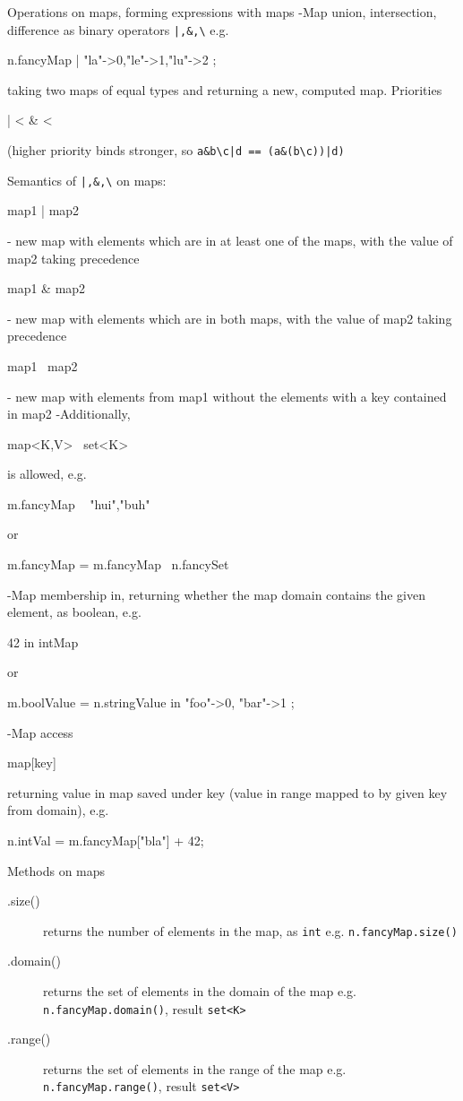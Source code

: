 Operations on maps, forming expressions with maps
-Map union, intersection, difference as binary operators
\verb#|,&,\#
e.g. 
\begin{grgenlet} 
n.fancyMap | { "la"->0,"le"->1,"lu"->2 };
\end{grgenlet}
taking two maps of equal types and returning a new, computed map.
Priorities 
\begin{grgenlet}
| < & < \
\end{grgenlet}
(higher priority binds stronger, so
\verb#a&b\c|d == (a&(b\c))|d)#

Semantics of \verb#|,&,\# on maps:
\begin{grgenlet}
map1 | map2
\end{grgenlet}
 - new map with elements which are in at least one of the maps, with the value of map2 taking precedence
\begin{grgenlet}
map1 & map2
\end{grgenlet}
- new map with elements which are in both maps, with the value of map2 taking precedence
\begin{grgenlet}
map1 \ map2
\end{grgenlet}
- new map with elements from map1 without the elements with a key contained in map2
-Additionally, 
\begin{grgenlet}
map<K,V> \ set<K>
\end{grgenlet}
is allowed, e.g.
\begin{grgenlet}
m.fancyMap \ { "hui","buh" }
\end{grgenlet} 
or 
\begin{grgenlet}
m.fancyMap = m.fancyMap \ n.fancySet 
\end{grgenlet}
-Map membership in, returning whether the map domain contains the given element, as boolean, e.g. 
\begin{grgenlet}
42 in intMap
\end{grgenlet}  
or  
\begin{grgenlet}
m.boolValue = n.stringValue in { "foo"->0, "bar"->1 };
\end{grgenlet}
-Map access 
\begin{grgenlet}
map[key]
\end{grgenlet}
returning value in map saved under key (value in range mapped to by given key from domain), e.g.
\begin{grgenlet}
n.intVal = m.fancyMap["bla"] + 42;
\end{grgenlet}

Methods on maps
\begin{description}
  \item[.size()] returns the number of elements in the map, as \texttt{int}
 e.g. \texttt{n.fancyMap.size()}
  \item[.domain()] returns the set of elements in the domain of the map
 e.g. \texttt{n.fancyMap.domain()}, result \verb#set<K>#
  \item[.range()] returns the set of elements in the range of the map
 e.g. \texttt{n.fancyMap.range()}, result \verb#set<V>#
\end{description}

